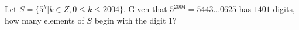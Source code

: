 Let $S = \{5^ k | k \in Z, 0  \le  k \le 2004\}$. Given that $5^{2004} = 5443 ...0625$ has $1401$ digits, how many elements of $S$ begin with the digit $1$?
